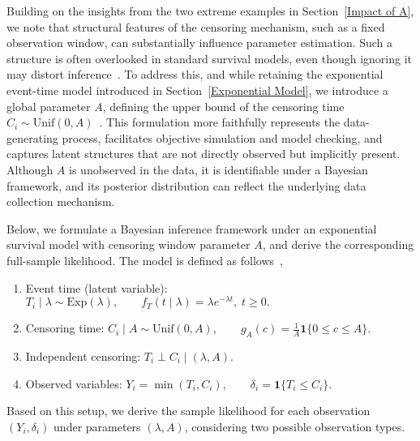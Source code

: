 Building on the insights from the two extreme examples in Section~\ref{Impact of A}, we note that structural features of the censoring mechanism, such as a fixed observation window, can substantially influence parameter estimation. Such a structure is often overlooked in standard survival models, even though ignoring it may distort inference~\cite{bartovs2022informed,barrajón2020effectrightcensoringbias}. To address this, and while retaining the exponential event-time model introduced in Section~\ref{Exponential Model}, we introduce a global parameter $A$, defining the upper bound of the censoring time $C_i \sim \mathrm{Unif}(0, A)$~\cite{ibrahim2013bayesian}. This formulation more faithfully represents the data-generating process, facilitates objective simulation and model checking, and captures latent structures that are not directly observed but implicitly present. Although $A$ is unobserved in the data, it is identifiable under a Bayesian framework, and its posterior distribution can reflect the underlying data collection mechanism.

Below, we formulate a Bayesian inference framework under an exponential survival model with censoring window parameter $A$, and derive the corresponding full-sample likelihood. The model is defined as follows~\cite{ibrahim2013bayesian, bartovs2022informed, gelman1995bayesian},
\begin{enumerate}
    \item Event time (latent variable): $
    T_i \mid \lambda \sim \mathrm{Exp}(\lambda), 
    \qquad f_T(t \mid \lambda)=\lambda e^{-\lambda t},\; t\ge0.
    $
   \item Censoring time: $
   C_i \mid A \sim \mathrm{Unif}(0,A), 
   \qquad g_A(c)=\tfrac1A \mathbf 1\{0\le c\le A\}.
   $
   \item Independent censoring: $T_i \perp C_i \mid (\lambda, A).$
   \item Observed variables: $ Y_i=\min(T_i,C_i), \qquad 
   \delta_i=\mathbf 1\{T_i\le C_i\}.
   $
\end{enumerate}
Based on this setup, we derive the sample likelihood for each observation $(Y_i, \delta_i)$ under parameters $(\lambda, A)$, considering two possible observation types.


